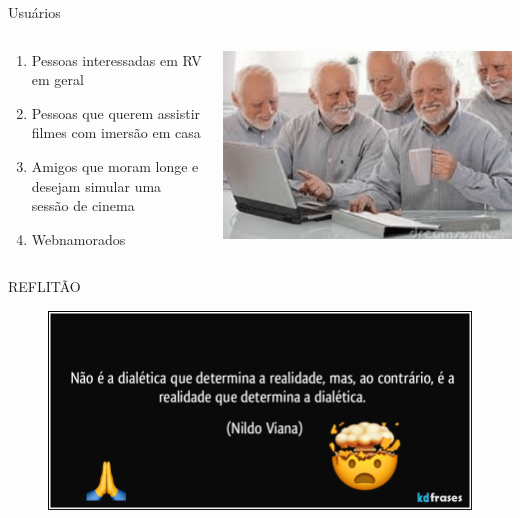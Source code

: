 \documentclass[12pt]{beamer}
\begin{document}
\begin{frame}{Usuários}
    \begin{columns}
        \begin{column}{0.65\textwidth}
            \begin{enumerate}[label=•]
        		\item Pessoas interessadas em RV em geral
        		\item Pessoas que querem assistir filmes com imersão em casa
        		\item Amigos que moram longe e desejam simular uma sessão de cinema
                \item Webnamorados
            \end{enumerate}
        \end{column}
        
        \begin{column}{0.35\textwidth}
            \begin{center}
                \includegraphics[width=1\textwidth]{figuras/haroldusuarios.png}
             \end{center}
        \end{column}
    \end{columns}
\end{frame}

\begin{frame}[standout]{REFLITÃO}
    \begin{figure}
        \includegraphics[scale=0.35]{figuras/reflitao.png}
    \end{figure}
\end{frame}
\end{document}
